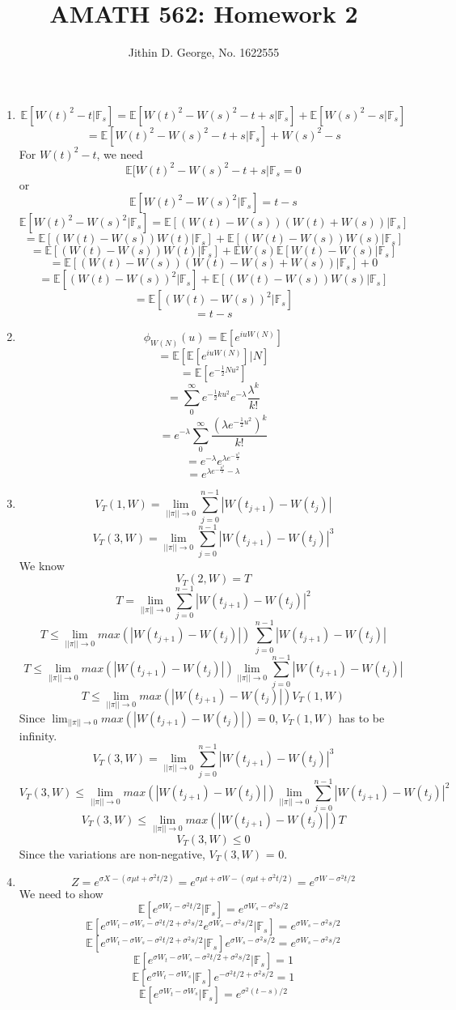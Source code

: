 \documentclass[a4paper,11pt]{article}
\title{AMATH 562: Homework 2}
\author{Jithin D. George, No. 1622555}
\begin{document}
\maketitle
\begin{enumerate}
\item
\[\mathbb{E}[W(t)^2-t|\mathbb{F}_s]=\mathbb{E}[W(t)^2-W(s)^2-t+s|\mathbb{F}_s]+\mathbb{E}[W(s)^2-s|\mathbb{F}_s]\]
\[=\mathbb{E}[W(t)^2-W(s)^2-t+s|\mathbb{F}_s]+W(s)^2-s\]
For $W(t)^2-t$, we need
\[\mathbb{E}[W(t)^2-W(s)^2-t+s|\mathbb{F}_s=0\]
or
\[ \mathbb{E}[W(t)^2-W(s)^2|\mathbb{F}_s]=t-s\]
\[\mathbb{E}[W(t)^2-W(s)^2|\mathbb{F}_s]=\mathbb{E}[(W(t)-W(s))(W(t)+W(s))|\mathbb{F}_s]\]
\[=\mathbb{E}[(W(t)-W(s))W(t)|\mathbb{F}_s]+\mathbb{E}[(W(t)-W(s))W(s)|\mathbb{F}_s]\]
\[=\mathbb{E}[(W(t)-W(s))W(t)|\mathbb{F}_s]+\mathbb{E}W(s)\mathbb{E}[W(t)-W(s)|\mathbb{F}_s]\]
\[=\mathbb{E}[(W(t)-W(s))(W(t)-W(s)+W(s))|\mathbb{F}_s]+0 \]
\[=\mathbb{E}[(W(t)-W(s))^2|\mathbb{F}_s]+\mathbb{E}[(W(t)-W(s))W(s)|\mathbb{F}_s]\]
\[=\mathbb{E}[(W(t)-W(s))^2|\mathbb{F}_s]\]
\[=t-s\]
\item 

\[\phi_{W(N)}(u)=\mathbb{E}[e^{iuW(N)}]\]
\[=\mathbb{E}[\mathbb{E}[e^{iuW(N)}]|N]\]
\[=\mathbb{E}[e^{-\frac{1}{2}Nu^2}]\]
\[=\sum_{0}^{\infty} e^{-\frac{1}{2}ku^2}e^{-\lambda}\frac{\lambda^k}{k!}\]
\[=e^{-\lambda} \sum_{0}^{\infty} \frac{(\lambda e^{-\frac{1}{2}u^2})^k}{k!}\]
\[=e^{-\lambda}  e^{\lambda e^{-\frac{u^2}{2}}}\]
\[= e^{\lambda e^{-\frac{u^2}{2}}-\lambda}\]
\item
\[V_T(1,W)=\lim_{||\pi||\to 0}\sum_{j=0}^{n-1}|W(t_{j+1})-W(t_{j})|\]
\[V_T(3,W)=\lim_{||\pi||\to 0}\sum_{j=0}^{n-1}|W(t_{j+1})-W(t_{j})|^3\]
We know
\[V_T(2,W) = T\]
\[T=\lim_{||\pi||\to 0}\sum_{j=0}^{n-1}|W(t_{j+1})-W(t_{j})|^2\]
\[T\leq \lim_{||\pi||\to 0}max(|W(t_{j+1})-W(t_{j})|)\ \sum_{j=0}^{n-1}|W(t_{j+1})-W(t_{j})|\]
\[T\leq \lim_{||\pi||\to 0}max(|W(t_{j+1})-W(t_{j})|)\lim_{||\pi||\to 0} \sum_{j=0}^{n-1}|W(t_{j+1})-W(t_{j})|\]
\[T\leq \lim_{||\pi||\to 0}max(|W(t_{j+1})-W(t_{j})|) V_T(1,W)\]
Since $\lim_{||\pi||\to 0}max(|W(t_{j+1})-W(t_{j})|) = 0$, $V_T(1,W)$ has to be infinity.
\[V_T(3,W)=\lim_{||\pi||\to 0}\sum_{j=0}^{n-1}|W(t_{j+1})-W(t_{j})|^3\]
\[V_T(3,W) \leq \lim_{||\pi||\to 0}max(|W(t_{j+1})-W(t_{j})|)\lim_{||\pi||\to 0} \sum_{j=0}^{n-1}|W(t_{j+1})-W(t_{j})|^2 \]
\[V_T(3,W) \leq \lim_{||\pi||\to 0}max(|W(t_{j+1})-W(t_{j})|)T \]
\[V_T(3,W) \leq 0\]
Since the variations are non-negative, $V_T(3,W)$ = 0.
\item
\[Z = e^{\sigma X -(\sigma \mu t +\sigma^2 t/2)}= e^{\sigma \mu t +\sigma W -(\sigma \mu t +\sigma^2 t/2)}= e^{\sigma W - \sigma^2 t/2}\]
We need to show
\[\mathbb{E}[e^{\sigma W_t - \sigma^2 t/2}|\mathbb{F}_s]= e^{\sigma W_s - \sigma^2 s/2}\]
\[\mathbb{E}[e^{\sigma W_t-\sigma W_s - \sigma^2 t/2 +\sigma^2 s/2} e^{\sigma W_s - \sigma^2 s/2}|\mathbb{F}_s]= e^{\sigma W_s - \sigma^2 s/2}\]
\[\mathbb{E}[e^{\sigma W_t-\sigma W_s - \sigma^2 t/2 +\sigma^2 s/2} |\mathbb{F}_s] e^{\sigma W_s - \sigma^2 s/2}= e^{\sigma W_s - \sigma^2 s/2}\]
\[\mathbb{E}[e^{\sigma W_t-\sigma W_s - \sigma^2 t/2 +\sigma^2 s/2} |\mathbb{F}_s]= 1 \]
\[\mathbb{E}[e^{\sigma W_t-\sigma W_s } |\mathbb{F}_s]e^{- \sigma^2 t/2 +\sigma^2 s/2}= 1 \]
\[\mathbb{E}[e^{\sigma W_t-\sigma W_s } |\mathbb{F}_s]= e^{\sigma^2 (t-s)/2 } \]


\end{enumerate}
\end{document}
